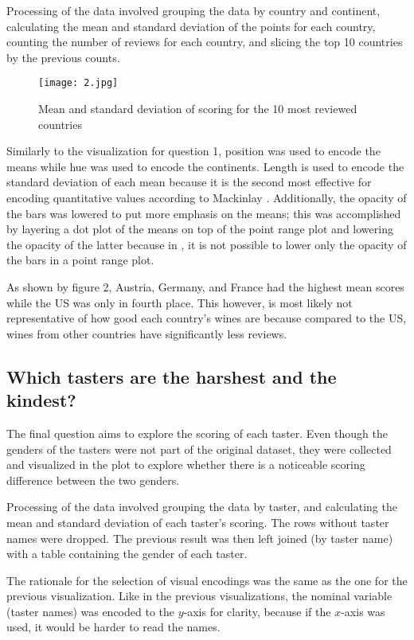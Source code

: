 Processing of the data involved grouping the data by country and continent, calculating the mean and standard deviation of the points for each country, counting the number of reviews for each country, and slicing the top 10 countries by the previous counts.

\begin{figure}[h]
  \texttt{[image: 2.jpg]} 
  \caption{Mean and standard deviation of scoring for the 10 most reviewed countries}
\end{figure}

Similarly to the visualization for question 1, position was used to encode the means while hue was used to encode the continents. Length is used to encode the standard deviation of each mean because it is the second most effective for encoding quantitative values according to Mackinlay \cite{Mackinlay}. Additionally, the opacity of the bars was lowered to put more emphasis on the means; this was accomplished by layering a dot plot of the means on top of the point range plot and lowering the opacity of the latter because in , it is not possible to lower only the opacity of the bars in a point range plot.

As shown by figure 2, Austria, Germany, and France had the highest mean scores while the US was only in fourth place. This however, is most likely not representative of how good each country's wines are because compared to the US, wines from other countries have significantly less reviews.

\subsection{Which tasters are the harshest and the kindest?}
The final question aims to explore the scoring of each taster. Even though the genders of the tasters were not part of the original dataset, they were collected and visualized in the plot to explore whether there is a noticeable scoring difference between the two genders.

Processing of the data involved grouping the data by taster, and calculating the mean and standard deviation of each taster's scoring. The rows without taster names were dropped. The previous result was then left joined (by taster name) with a table containing the gender of each taster.

The rationale for the selection of visual encodings was the same as the one for the previous visualization. Like in the previous visualizations, the nominal variable (taster names) was encoded to the $y$-axis for clarity, because if the $x$-axis was used, it would be harder to read the names.

